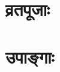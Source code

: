 \setcounter{page}{0}
\part{व्रतपूजाः}
\sectionmark{\mbox{}}
\renewcommand{\chaptermark}[1]{%
    \markboth{\large #1}{}}


\clearemptydoublepage
\part{उपाङ्गाः}




